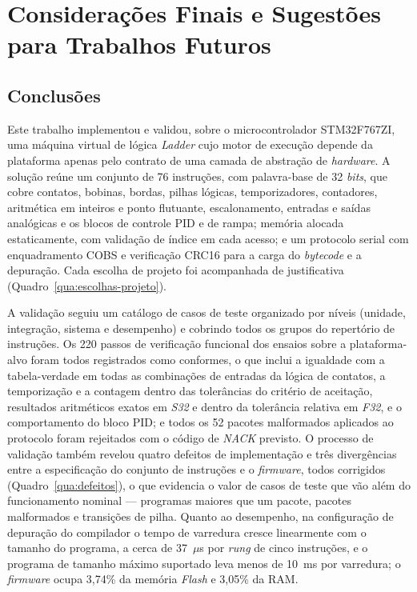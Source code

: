\chapter{Considerações Finais e Sugestões para Trabalhos Futuros}
\label{cap:finais}

\section{Conclusões}
\label{sec:conclusoes}

Este trabalho implementou e validou, sobre o microcontrolador STM32F767ZI, uma máquina virtual de lógica \textit{Ladder} cujo motor de execução depende da plataforma apenas pelo contrato de uma camada de abstração de \textit{hardware}.
A solução reúne um conjunto de 76 instruções, com palavra-base de 32 \textit{bits}, que cobre contatos, bobinas, bordas, pilhas lógicas, temporizadores, contadores, aritmética em inteiros e ponto flutuante, escalonamento, entradas e saídas analógicas e os blocos de controle PID e de rampa; memória alocada estaticamente, com validação de índice em cada acesso; e um protocolo serial com enquadramento COBS e verificação CRC16 para a carga do \textit{bytecode} e a depuração.
Cada escolha de projeto foi acompanhada de justificativa (Quadro~\ref{qua:escolhas-projeto}).

A validação seguiu um catálogo de casos de teste organizado por níveis (unidade, integração, sistema e desempenho) e cobrindo todos os grupos do repertório de instruções.
Os 220 passos de verificação funcional dos ensaios sobre a plataforma-alvo foram todos registrados como conformes, o que inclui a igualdade com a tabela-verdade em todas as combinações de entradas da lógica de contatos, a temporização e a contagem dentro das tolerâncias do critério de aceitação, resultados aritméticos exatos em \textit{S32} e dentro da tolerância relativa em \textit{F32}, e o comportamento do bloco PID; e todos os 52 pacotes malformados aplicados ao protocolo foram rejeitados com o código de \textit{NACK} previsto.
O processo de validação também revelou quatro defeitos de implementação e três divergências entre a especificação do conjunto de instruções e o \textit{firmware}, todos corrigidos (Quadro~\ref{qua:defeitos}), o que evidencia o valor de casos de teste que vão além do funcionamento nominal --- programas maiores que um pacote, pacotes malformados e transições de pilha.
Quanto ao desempenho, na configuração de depuração do compilador o tempo de varredura cresce linearmente com o tamanho do programa, a cerca de 37~$\mu$s por \textit{rung} de cinco instruções, e o programa de tamanho máximo suportado leva menos de 10~ms por varredura; o \textit{firmware} ocupa 3,74\% da memória \textit{Flash} e 3,05\% da RAM.

